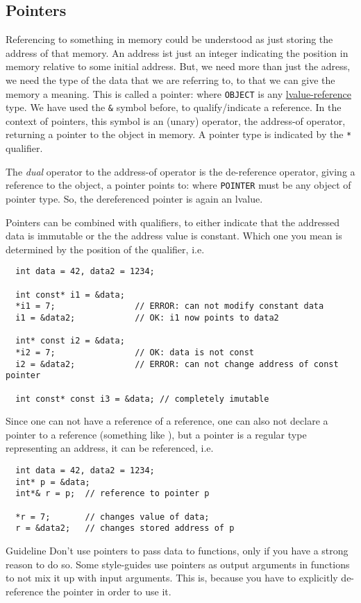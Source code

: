 \subsection{Pointers}
Referencing to something in memory could be understood as just storing the address of that memory. An address ist just an integer indicating
the position in memory relative to some initial address. But, we need more than just the adress, we need the type of the data that we are
referring to, to that we can give the memory a meaning. This is called a pointer:
%
%
where \texttt{OBJECT} is any \underline{lvalue-reference} type.
We have used the \texttt{\&} symbol before, to qualify/indicate a reference. In the context of pointers, this symbol is an (unary) operator, the
address-of operator, returning a pointer to the object in memory. A pointer type is indicated by the \texttt{*} qualifier.

The \textit{dual} operator to the address-of operator is the de-reference operator, giving a reference to the object, a pointer points to:
%
%
where \texttt{POINTER} must be any object of pointer type. So, the dereferenced pointer is again an lvalue.

Pointers can be combined with  qualifiers, to either indicate that the addressed data is immutable or the the address value is constant.
Which one you mean is determined by the position of the  qualifier, i.e.
%
\begin{verbatim}
  int data = 42, data2 = 1234;

  int const* i1 = &data;
  *i1 = 7;                // ERROR: can not modify constant data
  i1 = &data2;            // OK: i1 now points to data2

  int* const i2 = &data;
  *i2 = 7;                // OK: data is not const
  i2 = &data2;            // ERROR: can not change address of const pointer

  int const* const i3 = &data; // completely imutable
\end{verbatim}

Since one can not have a reference of a reference, one can also not declare a pointer to a reference (something like ), but a
pointer is a regular type representing an address, it can be referenced, i.e.
%
\begin{verbatim}
  int data = 42, data2 = 1234;
  int* p = &data;
  int*& r = p;  // reference to pointer p

  *r = 7;       // changes value of data;
  r = &data2;   // changes stored address of p
\end{verbatim}

\begin{guideline}{Guideline}
  Don't use pointers to pass data to functions, only if you have a strong reason to do so. Some style-guides use pointers as output arguments
  in functions to not mix it up with input arguments. This is, because you have to explicitly de-reference the pointer in order to use it.
\end{guideline}
